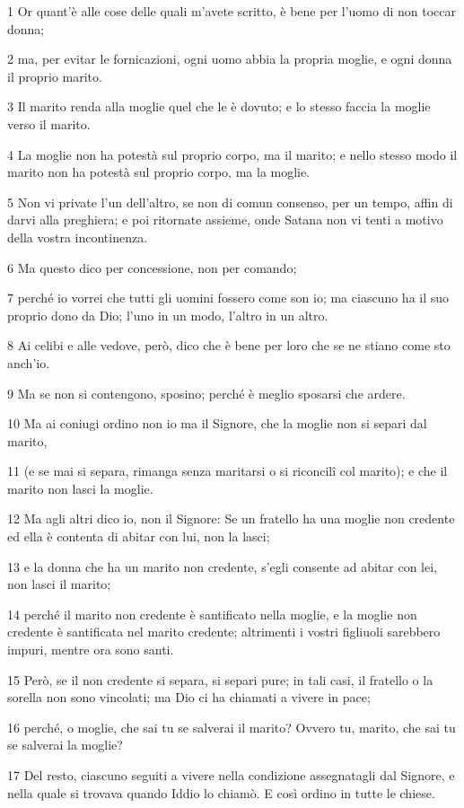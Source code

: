 \par 1 Or quant'è alle cose delle quali m'avete scritto, è bene per l'uomo di non toccar donna;
\par 2 ma, per evitar le fornicazioni, ogni uomo abbia la propria moglie, e ogni donna il proprio marito.
\par 3 Il marito renda alla moglie quel che le è dovuto; e lo stesso faccia la moglie verso il marito.
\par 4 La moglie non ha potestà sul proprio corpo, ma il marito; e nello stesso modo il marito non ha potestà sul proprio corpo, ma la moglie.
\par 5 Non vi private l'un dell'altro, se non di comun consenso, per un tempo, affin di darvi alla preghiera; e poi ritornate assieme, onde Satana non vi tenti a motivo della vostra incontinenza.
\par 6 Ma questo dico per concessione, non per comando;
\par 7 perché io vorrei che tutti gli uomini fossero come son io; ma ciascuno ha il suo proprio dono da Dio; l'uno in un modo, l'altro in un altro.
\par 8 Ai celibi e alle vedove, però, dico che è bene per loro che se ne stiano come sto anch'io.
\par 9 Ma se non si contengono, sposino; perché è meglio sposarsi che ardere.
\par 10 Ma ai coniugi ordino non io ma il Signore, che la moglie non si separi dal marito,
\par 11 (e se mai si separa, rimanga senza maritarsi o si riconcilî col marito); e che il marito non lasci la moglie.
\par 12 Ma agli altri dico io, non il Signore: Se un fratello ha una moglie non credente ed ella è contenta di abitar con lui, non la lasci;
\par 13 e la donna che ha un marito non credente, s'egli consente ad abitar con lei, non lasci il marito;
\par 14 perché il marito non credente è santificato nella moglie, e la moglie non credente è santificata nel marito credente; altrimenti i vostri figliuoli sarebbero impuri, mentre ora sono santi.
\par 15 Però, se il non credente si separa, si separi pure; in tali casi, il fratello o la sorella non sono vincolati; ma Dio ci ha chiamati a vivere in pace;
\par 16 perché, o moglie, che sai tu se salverai il marito? Ovvero tu, marito, che sai tu se salverai la moglie?
\par 17 Del resto, ciascuno seguiti a vivere nella condizione assegnatagli dal Signore, e nella quale si trovava quando Iddio lo chiamò. E così ordino in tutte le chiese.
